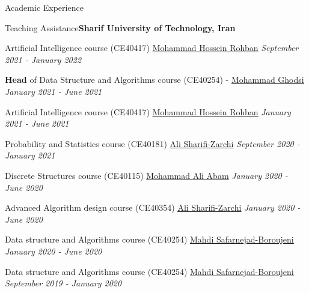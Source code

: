 \documentclass{resume} %
\begin{document}


\begin{rSection}{Academic Experience}
\begin{rSubsection}{Teaching Assistance}{\textcolor{Black!70}{\bf Sharif University of Technology, Iran}}{}{}
\begin{small}
\item Artificial Intelligence course (CE40417) \href{http://blogs.bu.edu/mhrohban/}{\underline{Mohammad Hossein Rohban}} \hfill \textcolor{Black!70}{\it September 2021 - January 2022}
\item {\bf Head}  of Data Structure and Algorithms course (CE40254) - \href{http://sharif.edu/~ghodsi/}{\underline{Mohammad Ghodsi}} \hfill \textcolor{Black!70}{\it January 2021 - June 2021}
\item Artificial Intelligence course (CE40417) \href{http://blogs.bu.edu/mhrohban/}{\underline{Mohammad Hossein Rohban}} \hfill \textcolor{Black!70}{\it January 2021 - June 2021}
\item Probability and Statistics course (CE40181) \href{https://scholar.google.com/citations?user=GbJMZLIAAAAJ&hl=en}{\underline{Ali Sharifi-Zarchi}} \hfill \textcolor{Black!70}{\it September 2020 - January 2021}
\item Discrete Structures course (CE40115) \href{https://scholar.google.com/citations?user=xuNJ-d8AAAAJ&hl=en}{\underline{Mohammad Ali Abam}} \hfill \textcolor{Black!70}{\it January 2020 - June 2020}
\item Advanced Algorithm design course (CE40354) \href{https://scholar.google.com/citations?user=GbJMZLIAAAAJ&hl=en}{\underline{Ali Sharifi-Zarchi}} \hfill \textcolor{Black!70}{\it January 2020 - June 2020} 
\item Data structure and Algorithms course (CE40254) \href{https://scholar.google.com/citations?user=TNfL9SIAAAAJ&hl=en}{\underline{Mahdi Safarnejad-Boroujeni}} \hfill \textcolor{Black!70}{\it January 2020 - June 2020}
\item Data structure and Algorithms course (CE40254) \href{https://scholar.google.com/citations?user=TNfL9SIAAAAJ&hl=en}{\underline{Mahdi Safarnejad-Boroujeni}} \hfill \textcolor{Black!70}{\it September 2019 - January 2020}
\end{small}
\end{rSubsection}
\end{rSection}
\end{document}
